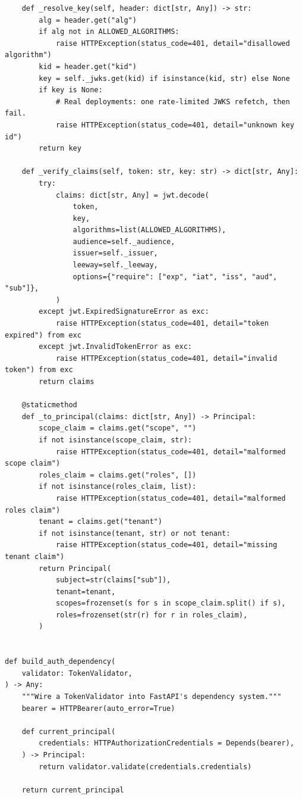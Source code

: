 \begin{verbatim}
    def _resolve_key(self, header: dict[str, Any]) -> str:
        alg = header.get("alg")
        if alg not in ALLOWED_ALGORITHMS:
            raise HTTPException(status_code=401, detail="disallowed algorithm")
        kid = header.get("kid")
        key = self._jwks.get(kid) if isinstance(kid, str) else None
        if key is None:
            # Real deployments: one rate-limited JWKS refetch, then fail.
            raise HTTPException(status_code=401, detail="unknown key id")
        return key

    def _verify_claims(self, token: str, key: str) -> dict[str, Any]:
        try:
            claims: dict[str, Any] = jwt.decode(
                token,
                key,
                algorithms=list(ALLOWED_ALGORITHMS),
                audience=self._audience,
                issuer=self._issuer,
                leeway=self._leeway,
                options={"require": ["exp", "iat", "iss", "aud", "sub"]},
            )
        except jwt.ExpiredSignatureError as exc:
            raise HTTPException(status_code=401, detail="token expired") from exc
        except jwt.InvalidTokenError as exc:
            raise HTTPException(status_code=401, detail="invalid token") from exc
        return claims

    @staticmethod
    def _to_principal(claims: dict[str, Any]) -> Principal:
        scope_claim = claims.get("scope", "")
        if not isinstance(scope_claim, str):
            raise HTTPException(status_code=401, detail="malformed scope claim")
        roles_claim = claims.get("roles", [])
        if not isinstance(roles_claim, list):
            raise HTTPException(status_code=401, detail="malformed roles claim")
        tenant = claims.get("tenant")
        if not isinstance(tenant, str) or not tenant:
            raise HTTPException(status_code=401, detail="missing tenant claim")
        return Principal(
            subject=str(claims["sub"]),
            tenant=tenant,
            scopes=frozenset(s for s in scope_claim.split() if s),
            roles=frozenset(str(r) for r in roles_claim),
        )


def build_auth_dependency(
    validator: TokenValidator,
) -> Any:
    """Wire a TokenValidator into FastAPI's dependency system."""
    bearer = HTTPBearer(auto_error=True)

    def current_principal(
        credentials: HTTPAuthorizationCredentials = Depends(bearer),
    ) -> Principal:
        return validator.validate(credentials.credentials)

    return current_principal



\end{verbatim}
